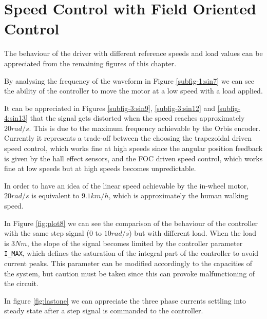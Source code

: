\clearpage
\section{Speed Control with Field Oriented Control}

The behaviour of the driver with different reference speeds and load values can be appreciated from the remaining figures of this chapter.

By analysing the frequency of the waveform in Figure \ref{subfig-1:sin7} we can see the ability of the controller to move the motor at a low speed with a load applied.

It can be appreciated in Figures \ref{subfig-3:sin9}, \ref{subfig-3:sin12} and \ref{subfig-4:sin13} that the signal gets distorted when the speed reaches approximately $20rad/s$. This is due to the maximum frequency achievable by the Orbis encoder. Currently it represents a trade-off between the choosing the trapezoidal driven speed control, which works fine at high speeds since the angular position feedback is given by the hall effect sensors, and the \ac{FOC} driven speed control, which works fine at low speeds but at high speeds becomes unpredictable.

In order to have an idea of the linear speed achievable by the in-wheel motor, $20rad/s$ is equivalent to $9.1km/h$, which is approximately the human walking speed.

In Figure \ref{fig:plot8} we can see the comparison of the behaviour of the controller with the same step signal ($0$ to $10 rad/s$) but with different load. When the load is $3 Nm$, the slope of the signal becomes limited by the controller parameter \texttt{I\_MAX}, which defines the saturation of the integral part of the controller to avoid current peaks. This parameter can be modified accordingly to the capacities of the system, but caution must be taken since this can provoke malfunctioning of the circuit.

In figure \ref{fig:lastone} we can appreciate the three phase currents settling into steady state after a step signal is commanded to the controller.

